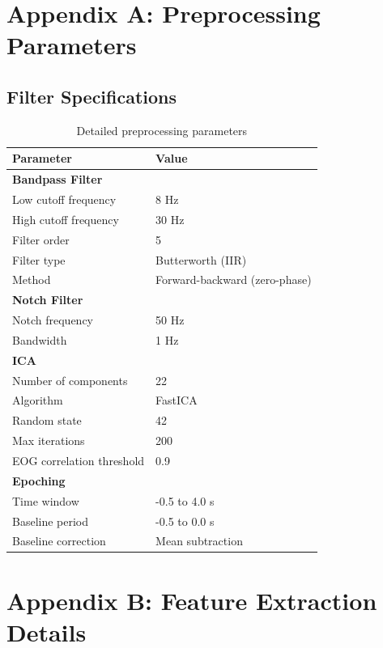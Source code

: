 \documentclass[11pt]{article}
\begin{document}
\newpage
\appendix

\section{Appendix A: Preprocessing Parameters}

\subsection{Filter Specifications}

\begin{table}[H]
\centering
\caption{Detailed preprocessing parameters}
\begin{tabular}{@{}ll@{}}
\toprule
\textbf{Parameter} & \textbf{Value} \\
\midrule
\textbf{Bandpass Filter} & \\
\quad Low cutoff frequency & 8 Hz \\
\quad High cutoff frequency & 30 Hz \\
\quad Filter order & 5 \\
\quad Filter type & Butterworth (IIR) \\
\quad Method & Forward-backward (zero-phase) \\
\midrule
\textbf{Notch Filter} & \\
\quad Notch frequency & 50 Hz \\
\quad Bandwidth & 1 Hz \\
\midrule
\textbf{ICA} & \\
\quad Number of components & 22 \\
\quad Algorithm & FastICA \\
\quad Random state & 42 \\
\quad Max iterations & 200 \\
\quad EOG correlation threshold & 0.9 \\
\midrule
\textbf{Epoching} & \\
\quad Time window & -0.5 to 4.0 s \\
\quad Baseline period & -0.5 to 0.0 s \\
\quad Baseline correction & Mean subtraction \\
\bottomrule
\end{tabular}
\end{table}

\section{Appendix B: Feature Extraction Details}
\end{document}
